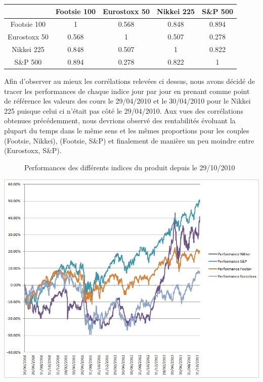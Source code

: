 \documentclass[french,12pt,a4paper]{article}
\begin{document}
\begin{spacing}{1.2}
\begin{center}
\begin{tabular}{|c|c|c|c|c|}
  \hline
   & Footsie 100 & Eurostoxx 50 & Nikkei 225 & S\&P 500 \\
  \hline
  Footsie 100 & 1 & 0.568 & 0.848 & 0.894\\
  Eurostoxx 50 & 0.568 & 1 & 0.507 & 0.278 \\
  Nikkei 225 & 0.848 & 0.507 & 1 & 0.822\\
  S\&P 500 & 0.894 & 0.278 & 0.822 & 1\\
  \hline
\end{tabular}
\end{center}
\end{spacing}

Afin d'observer au mieux les corrélations relevées ci dessus, nous avons décidé de tracer les performances de chaque indice jour par jour en prenant comme point de référence les valeurs des cours le 29/04/2010 et le 30/04/2010 pour le Nikkei 225 puisque celui ci n'était pas côté le 29/04/2010.
Aux vues des corrélations obtenues précédemment, nous devrions observé des rentabilités évoluant la plupart du temps dans le même sens et les mêmes proportions pour les couples (Footsie, Nikkei), (Footsie, S\&P) et finalement de manière un peu moindre entre (Eurostoxx, S\&P).


\begin{center}
\begin{figure}[h!]
\caption{Performances des différents indices du produit depuis le 29/10/2010}
\end{figure}
\end{center}


\begin{center}
\includegraphics[scale=0.5]{Correlations_indices.jpg}
\end{center}
\end{document}
